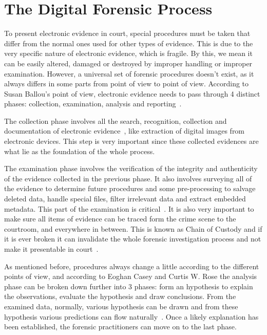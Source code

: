 \section{The Digital Forensic Process}
\label{process}

To present electronic evidence in court, special procedures must be taken that differ from the normal ones used for other types of evidence. This is due to the very specific nature of electronic evidence, which is fragile. By this, we mean it can be easily altered, damaged or destroyed by improper handling or improper examination. However, a universal set of forensic procedures doesn't exist, as it always differs in some parts from point of view to point of view. According to Susan Ballou's point of view, electronic evidence needs to pass through 4 distinct phases: collection, examination, analysis and reporting~\cite{ballou2010electronic}.

The collection phase involves all the search, recognition, collection and documentation of electronic evidence~\cite{ballou2010electronic}, like extraction of digital images from electronic devices. This step is very important since these collected evidences are what lie as the foundation of the whole process.

The examination phase involves the verification of the integrity and authenticity of the evidence collected in the previous phase. It also involves surveying all of the evidence to determine future procedures and some pre-processing to salvage deleted data, handle special files, filter irrelevant data and extract embedded metadata. This part of the examination is critical~\cite{casey2009handbook}. It is also very important to make sure all items of evidence can be traced form the crime scene to the courtroom, and everywhere in between. This is known as Chain of Custody and if it is ever broken it can invalidate the whole forensic investigation process and not make it presentable in court~\cite{ryder2002computer}.

As mentioned before, procedures always change a little according to the different points of view, and according to Eoghan Casey and Curtis W. Rose the analysis phase can be broken down further into 3 phases: form an hypothesis to explain the observations, evaluate the hypothesis and draw conclusions. From the examined data, normally, various hypothesis can be drawn and from these hypothesis various predictions can flow naturally~\cite{casey2009handbook}. Once a likely explanation has been established, the forensic practitioners can move on to the last phase.

